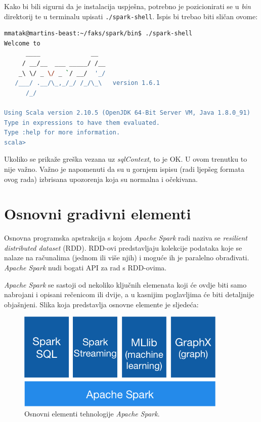 \documentclass[times, utf8, zavrsni]{fer}
\begin{document}
Kako bi bili sigurni da je instalacija uspješna, potrebno je pozicionirati se u \emph{bin} direktorij te u terminalu upisati \texttt{./spark-shell}. Ispis bi trebao biti sličan ovome:\\
\begin{lstlisting}[language=bash]
mmatak@martins-beast:~/faks/spark/bin$ ./spark-shell
Welcome to
      ____              __
     / __/__  ___ _____/ /__
    _\ \/ _ \/ _ `/ __/  '_/
   /___/ .__/\_,_/_/ /_/\_\   version 1.6.1
      /_/

Using Scala version 2.10.5 (OpenJDK 64-Bit Server VM, Java 1.8.0_91)
Type in expressions to have them evaluated.
Type :help for more information.
scala>
\end{lstlisting}


Ukoliko se prikaže greška vezana uz \emph{sqlContext}, to je OK. U ovom trenutku to nije važno. Važno je napomenuti da su u gornjem ispisu (radi ljepšeg formata ovog rada) izbrisana upozorenja  koja su normalna i očekivana.

\newpage
\section{Osnovni gradivni elementi}
Osnovna programska apstrakcija s kojom \emph{Apache Spark} radi naziva se \emph{resilient distributed dataset} (RDD). RDD-ovi predstavljaju kolekcije podataka koje se nalaze na računalima (jednom ili više njih) i moguće ih je paralelno obrađivati. \emph{Apache Spark} nudi bogati API za rad s RDD-ovima.

\emph{Apache Spark} se sastoji od nekoliko ključnih elemenata koji će ovdje biti samo nabrojani i opisani rečenicom ili dvije, a u kasnijim poglavljima će biti detaljnije objašnjeni. Slika koja predstavlja osnovne elemente je sljedeća: 
\begin{figure}[htb]
\centering
\includegraphics[width=10cm]{img/spark-stack.png}
\caption{Osnovni elementi tehnologije \emph{Apache Spark}.}
\label{fig:spark-stack}
\end{figure}
\end{document}

